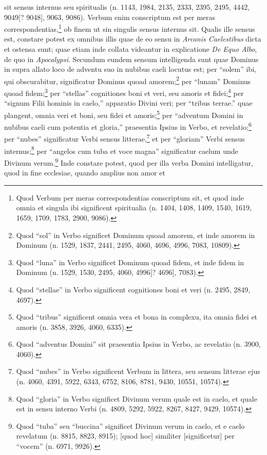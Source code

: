 \begin{topic}{1}
{    sit sensus internus seu spiritualis (n. 1143, 1984, 2135, 2333, 2395, 2495, 4442, 9049[? 9048], 9063, 9086).} Verbum
    enim conscriptum est per meras correspondentias,\footnote{Quod Verbum per meras correspondentias conscriptum sit, et
    quod inde omnia et singula ibi significent spiritualia (n. 1404, 1408, 1409, 1540, 1619, 1659, 1709, 1783, 2900,
    9086).} ob finem ut sin singulis sensus internus sit.
    Qualis ille sensus est, constare potest ex omnibus illis quae de eo sensu in \emph{Arcanis Caelestibus} dicta et
    ostensa sunt; quae etiam inde collata videantur in explicatione \emph{De Equo Albo}, de quo in \emph{Apocalypsi}.
    Secundum eundem sensum intelligenda sunt quae Dominus in supra allato loco de adventu suo in nubibus caeli locutus
    est; per ``solem'' ibi, qui obscurabitur, significatur Dominus quoad amorem;\footnote{Quod ``sol'' in Verbo
    significet Dominum quoad amorem, et inde amorem in Dominum (n. 1529, 1837, 2441, 2495, 4060, 4696, 4996, 7083,
    10809).} per ``lunam'' Dominus quoad fidem;\footnote{Quod ``luna'' in Verbo significet Dominum quoad fidem, et inde
    fidem in Dominum (n. 1529, 1530, 2495, 4060, 4996[? 4696], 7083).} per ``stellas'' cognitiones boni et veri, seu
    amoris et fidei;\footnote{Quod ``stellae'' in Verbo significent cognitiones boni et veri (n. 2495, 2849, 4697).} per
    ``signum Filii hominis in caelo,'' apparatio Divini veri; per ``tribus terrae.'' quae plangent, omnia veri et boni,
    seu fidei et amoris;\footnote{Quod ``tribus'' significent omnia vera et bona in complexu, ita omnia fidei et amoris
    (n. 3858, 3926, 4060, 6335).} per ``adventum Domini in nubibus caeli cum potentia et gloria,'' praesentia Ipsius in
    Verbo, et revelatio;\footnote{Quod ``adventus Domini'' sit praesentia Ipsius in Verbo, ac revelatio (n. 3900, 4060).
    } per ``nubes'' significatur Verbi sensus litterae,\footnote{Quod ``nubes'' in Verbo significent Verbum in littera,
    seu sensum litterae ejus (n. 4060, 4391, 5922, 6343, 6752, 8106, 8781, 9430, 10551, 10574).} et per ``gloriam''
    Verbi sensus internus;\footnote{Quod ``gloria'' in Verbo significet Divinum verum quale est in caelo, et quale est
    in sensu interno Verbi (n. 4809, 5292, 5922, 8267, 8427, 9429, 10574).} per ``angelos cum tuba et voce magna''
    significatur caelum unde Divinum verum.\footnote{Quod ``tuba'' seu ``buccina'' significet Divinum verum in caelo, et
    e caelo revelatum (n. 8815, 8823, 8915); [quod hoc] similiter [significetur] per ``vocem'' (n. 6971, 9926).}
    Inde constare potest, quod per illa verba Domini intelligatur, quod in fine ecclesiae, quando amplius non amor et

\end{topic}
